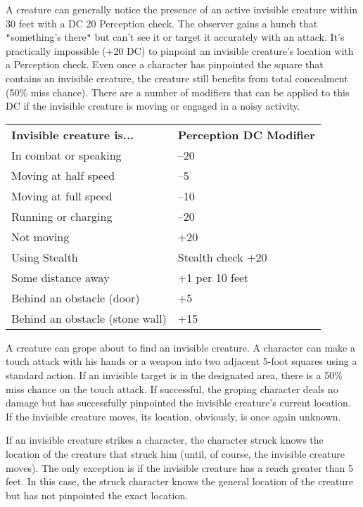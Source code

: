 A creature can generally notice the presence of an active invisible creature within 30 feet with a DC 20 Perception check. The observer gains a hunch that \texttt{{}"{}}something's there\texttt{{}"{}} but can't see it or target it accurately with an attack. It's practically impossible (+20 DC) to pinpoint an invisible creature's location with a Perception check. Even once a character has pinpointed the square that contains an invisible creature, the creature still benefits from total concealment (50\% miss chance). There are a number of modifiers that can be applied to this DC if the invisible creature is moving or engaged in a noisy activity.
\begin{tabular}{ll}
\textbf{Invisible creature is...} & \textbf{Perception DC Modifier} \\
In combat or speaking             & –20                             \\
Moving at half speed              & –5                              \\
Moving at full speed              & –10                             \\
Running or charging               & –20                             \\
Not moving                        & +20                             \\
Using Stealth                     & Stealth check +20               \\
Some distance away                & +1 per 10 feet                  \\
Behind an obstacle (door)         & +5                              \\
Behind an obstacle (stone wall)   & +15                            
\end{tabular}
				
A creature can grope about to find an invisible creature. A character can make a touch attack with his hands or a weapon into two adjacent 5-foot squares using a standard action. If an invisible target is in the designated area, there is a 50\% miss chance on the touch attack. If successful, the groping character deals no damage but has successfully pinpointed the invisible creature's current location. If the invisible creature moves, its location, obviously, is once again unknown.
				
If an invisible creature strikes a character, the character struck knows the location of the creature that struck him (until, of course, the invisible creature moves). The only exception is if the invisible creature has a reach greater than 5 feet. In this case, the struck character knows the general location of the creature but has not pinpointed the exact location.
				
